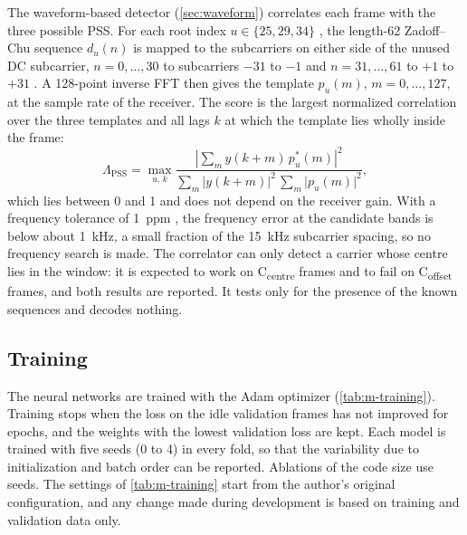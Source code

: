 The waveform-based detector (\cref{sec:waveform}) correlates each frame with the three possible PSS. For each root index $u \in \{25, 29, 34\}$ \parencite[Table~6.11.1.1-1]{3gpp2026a}, the length-62 Zadoff--Chu sequence $d_u(n)$ \parencite[clause~6.11.1.1]{3gpp2026a} is mapped to the subcarriers on either side of the unused DC subcarrier, $n = 0, \dots, 30$ to subcarriers $-31$ to $-1$ and $n = 31, \dots, 61$ to $+1$ to $+31$ \parencite[clause~6.11.1.2]{3gpp2026a}. A 128-point inverse FFT then gives the template $p_u(m)$, $m = 0, \dots, 127$, at the sample rate of the receiver. The score is the largest normalized correlation over the three templates and all lags $k$ at which the template lies wholly inside the frame:
\begin{equation}
  \Lambda_{\mathrm{PSS}} = \max_{u,\,k} \frac{\left\lvert \sum_{m} y(k+m)\, p_u^{*}(m) \right\rvert^2}{\sum_{m} \lvert y(k+m) \rvert^2 \, \sum_{m} \lvert p_u(m) \rvert^2},
  \label{eq:m-pss}
\end{equation}
which lies between 0 and 1 and does not depend on the receiver gain. With a frequency tolerance of \qty{1}{ppm} \parencite{rtlsdrblog2024}, the frequency error at the candidate bands is below about \qty{1}{\kilo\hertz}, a small fraction of the \qty{15}{\kilo\hertz} subcarrier spacing, so no frequency search is made. The correlator can only detect a carrier whose centre lies in the window: it is expected to work on C\textsubscript{centre} frames and to fail on C\textsubscript{offset} frames, and both results are reported. It tests only for the presence of the known sequences and decodes nothing.

\subsection{Training}
\label{sec:m-training}

The neural networks are trained with the Adam optimizer \parencite{kingma2015} (\cref{tab:m-training}). Training stops when the loss on the idle validation frames has not improved for  epochs, and the weights with the lowest validation loss are kept. Each model is trained with five seeds (0 to 4) in every fold, so that the variability due to initialization and batch order can be reported. Ablations of the code size use  seeds. The settings of \cref{tab:m-training} start from the author's original configuration, and any change made during development is based on training and validation data only.

